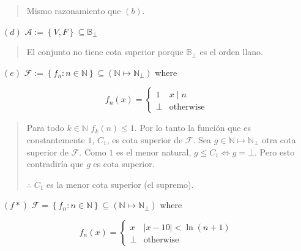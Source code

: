\documentclass[article, 12pt]{article}
\begin{document}
\small
\begin{quote}

Mismo razonamiento que $(b)$.

\end{quote}
\normalsize


$(d)$ $\mathcal{A} := \left\{ V, F \right\} \subseteq \mathbb{B}_\bot$


\small
\begin{quote}

El conjunto no tiene cota superior porque $\mathbb{B}_\bot $ es el orden llano.

\end{quote}
\normalsize


$(e)$ $\mathcal{F} := \left\{ f_n : n \in \mathbb{N} \right\} \subseteq
\left( \mathbb{N} \mapsto \mathbb{N}_\bot  \right) $ where 

\begin{equation*}
  f_n(x) = \begin{cases}
    1 & x \mid n \\ 
    \bot & \text{otherwise}
  \end{cases}
\end{equation*}


\small
\begin{quote}

Para todo $k\in \mathbb{N}$ $f_k(n) \leq 1$. Por lo tanto la función que es
constantemente $1$, $C_1$, es cota superior de $\mathcal{F}$. Sea 
$g \in \mathbb{N} \mapsto \mathbb{N}_\bot$ otra cota superior de $\mathcal{F}$.
Como $1$ es el menor natural, $g \leq C_1 \iff g = \bot $. Pero esto
contradiría que $g$ es cota superior. 

$\therefore $ $C_1$ es la menor cota superior (el supremo).


\end{quote}
\normalsize


$(f*)$ $\mathcal{F} = \left\{ f_n : n \in \mathbb{N} \right\} \subseteq
\left( \mathbb{N} \mapsto \mathbb{N}_\bot  \right) $ where 

\begin{equation*}
  f_n(x) = \begin{cases}
    x & |x - 10| < \ln \left( n + 1 \right) \\ 
    \bot  & \text{otherwise}
  \end{cases}
\end{equation*}
\end{document}
